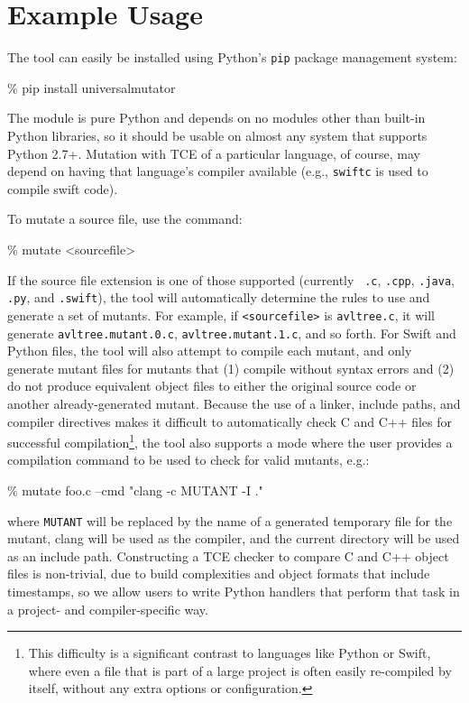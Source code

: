 \section{Example Usage}

The tool can easily be installed using Python's {\tt pip} package management system:

\begin{code}
\% pip install universalmutator
\end{code}

The module is pure Python and depends on no modules other than
built-in Python libraries, so it should be usable on almost any system
that supports Python 2.7+.  Mutation with TCE of a particular
language, of course, may depend on having that language's compiler
available (e.g., {\tt swiftc} is used to compile swift code).

To mutate a source file, use the command:


\begin{code}
\% mutate <sourcefile>
\end{code}

If the source file extension is one of those supported (currently {\tt
  .c}, {\tt .cpp}, {\tt .java}, {\tt .py}, and {\tt .swift}), the tool
will automatically determine the rules to use and generate a set of
mutants.  For example, if {\tt <sourcefile>} is {\tt avltree.c}, it
will generate {\tt avltree.mutant.0.c}, {\tt avltree.mutant.1.c}, and
so forth.  For Swift and Python files, the tool will also attempt to
compile each mutant, and only generate mutant files for mutants that
(1) compile without syntax errors and (2) do not produce equivalent
object files to either the original source code or another
already-generated mutant.  Because the use of a linker, include paths, and
compiler directives makes it difficult to automatically check C and
C++ files for successful compilation\footnote{This difficulty is a
  significant contrast to languages
  like Python or Swift, where even a file that is part of a large
  project is often easily re-compiled by itself, without any extra
  options or configuration.}, the tool also supports a mode where the
user provides a compilation command to be used to check for valid
mutants, e.g.:


\begin{code}
\% mutate foo.c --cmd "clang -c MUTANT -I ."
\end{code}

\noindent where {\tt MUTANT} will be replaced by the name of a
generated temporary file for the mutant, clang will be used as the
compiler, and the current directory will be used as an include path.  Constructing a TCE checker
to compare C and C++ object files is non-trivial, due to build
complexities and object formats that include timestamps, so we allow
users to write Python handlers that perform that task in a project- and
compiler-specific way.

